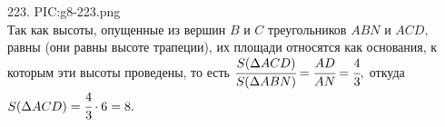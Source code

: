 223. {{PIC:g8-223.png}}\\
Так как высоты, опущенные из вершин $B$ и $C$ треугольников $ABN$ и $ACD,$ равны (они равны высоте трапеции), их площади относятся как основания, к которым эти высоты проведены, то есть $\cfrac{S(\Delta ACD)}{S(\Delta ABN)}=\cfrac{AD}{AN}=\cfrac{4}{3},$ откуда $S(\Delta ACD)=\cfrac{4}{3}\cdot6=8.$\\
